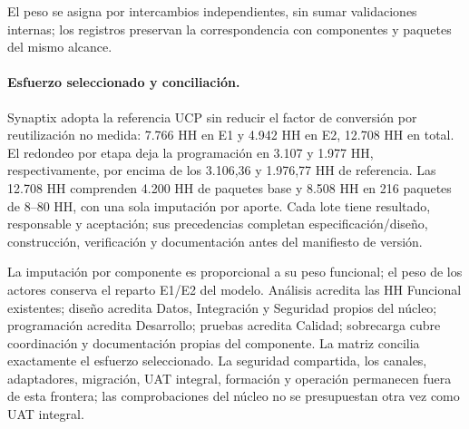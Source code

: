 El peso se asigna por intercambios independientes, sin sumar validaciones internas; los registros preservan la correspondencia con componentes y paquetes del mismo alcance.
\fi

\paragraph{Esfuerzo seleccionado y conciliación.} Synaptix adopta la referencia UCP sin reducir el factor de conversión por reutilización no medida: 7.766 HH en E1 y 4.942 HH en E2, 12.708 HH en total. El redondeo por etapa deja la programación en 3.107 y 1.977 HH, respectivamente, por encima de los 3.106,36 y 1.976,77 HH de referencia. Las 12.708 HH comprenden 4.200 HH de paquetes base y 8.508 HH en 216 paquetes de 8--80 HH, con una sola imputación por aporte. Cada lote tiene resultado, responsable y aceptación; sus precedencias completan especificación/diseño, construcción, verificación y documentación antes del manifiesto de versión.

La imputación por componente es proporcional a su peso funcional; el peso de los actores conserva el reparto E1/E2 del modelo. Análisis acredita las HH Funcional existentes; diseño acredita Datos, Integración y Seguridad propios del núcleo; programación acredita Desarrollo; pruebas acredita Calidad; sobrecarga cubre coordinación y documentación propias del componente. La matriz  concilia exactamente el esfuerzo seleccionado. La seguridad compartida, los canales, adaptadores, migración, UAT integral, formación y operación permanecen fuera de esta frontera; las comprobaciones del núcleo no se presupuestan otra vez como UAT integral.


